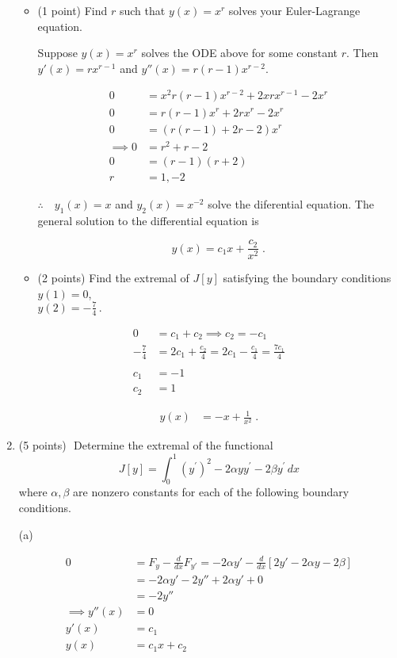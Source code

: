 \documentclass[12pt]{article}
\begin{document}
\begin{enumerate}
\begin{itemize}
\item (1 point)\,\,Find $r$ such that $y(x) = x^r$ solves your Euler-Lagrange equation.

Suppose $y(x) = x^r$ solves the ODE above for some constant $r$. Then $y'(x) = rx^{r-1}$ and  $y''(x) = r(r-1)x^{r-2}$.

\begin{align*}
0 &= x^2r(r-1)x^{r-2} + 2xrx^{r-1} - 2x^r \\
0&= r(r-1)x^r + 2rx^r - 2x^r \\
0 &= (r(r-1) + 2r - 2)x^r \\
\implies 0 &= r^2 + r - 2 \\
0 &= (r-1)(r+2)\\
r &= 1, -2
\end{align*}

$\therefore \quad y_1(x) = x$ and  $y_2(x) = x^{-2}$  solve the diferential equation. The general solution to the differential equation is

$$y(x) = c_1x + \frac{c_2}{x^2} \;. $$

\newpage
\item (2 points)\,\,Find the extremal of $J[y]$ satisfying the boundary conditions $y(1) = 0$, \\
$y(2) = -\frac{7}{4}\,.$
\end{itemize}

\begin{align*}
0 &= c_1 + c_2 \implies c_2 = -c_1\\
-\frac{7}{4}& =  2c_1 +\frac{c_2}{4} = 2c_1 - \frac{c_1}{4} = \frac{7c_1}{4}\\
\\
c_1 &= -1\\
c_2 &= 1
\end{align*}

\begin{align*}
y(x) &= -x + \frac{1}{x^2} \;.
\end{align*} 


\newpage
\item (5 points)\,\,
Determine the extremal of the functional
$$
J[y] = \int_0^1 (y^{\prime})^2 - 2\alpha y y^{\prime} - 2\beta y^{\prime}\,dx
$$
where $\alpha, \beta$ are nonzero constants for each of the following boundary conditions.

(a)

\begin{align*}
0 &= F_y - \frac{d}{dx}F_{y'} = -2\alpha y' - \frac{d}{dx}\left[2y' - 2\alpha y - 2\beta \right] \\
&= -2\alpha y' - 2y'' + 2\alpha y' + 0 \\
&= -2y'' \\
\implies y''(x) &= 0 \\
y'(x) &= c_1 \\
y(x) &= c_1x + c_2
\end{align*}


\end{enumerate}
\end{document}

